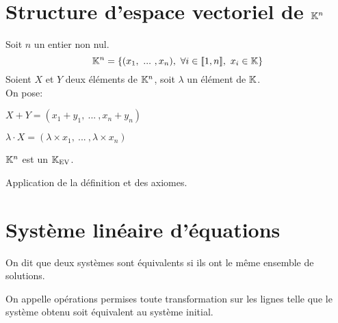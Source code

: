 \documentclass[12pt,twoside,a4paper]{article}
\author{MPSI 2}
\begin{document}
	\maketitle
	\section{Structure d'espace vectoriel de $\mathbb{K}^{n}$}
		\begin{defi}
			Soit $n$ un entier non nul.
			$$\K^{n}=\{(x_1,\ ...\ ,x_n),\ \forall i\in\lbracket1,n\rbracket,\ x_i\in\K \}$$
			Soient $X$ et $Y$ deux \'el\'ements de $\mathbb{K}^{n}$, soit $\lambda$ un \'el\'ement de $\mathbb{K}$.\\
			On pose:
			\begin{liste}
				\item $X+Y=(x_1+y_1,\ ...\ ,x_n+y_n)$
				\item $\lambda\cdot X=(\lambda\times x_1,\ ...\ ,\lambda \times x_n)$
			\end{liste}
		\end{defi}
		\begin{prop}
			$\mathbb{K}^{n}$ est un $\mathbb{K}_\mathrm{EV}$.
		\end{prop}
		\begin{preuve}
			Application de la d\'efinition et des axiomes.
		\end{preuve}
	\section{Syst\`eme lin\'eaire d'\'equations}
		\begin{defi}
			On dit que deux syst\`emes sont \'equivalents si ils ont le m\^eme ensemble de solutions.
		\end{defi}
		\begin{defi}
			On appelle op\'erations permises toute transformation sur les lignes telle que le syst\`eme obtenu soit \'equivalent au syst\`eme initial.
		\end{defi}
\end{document}
